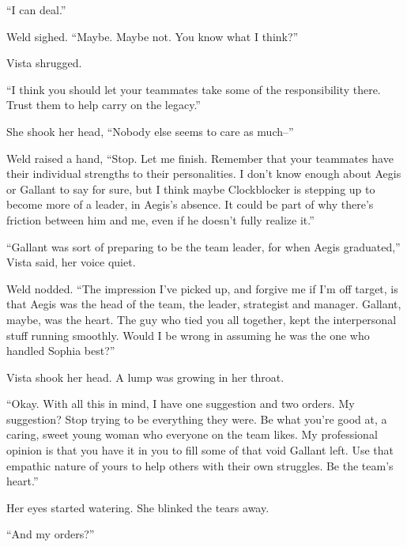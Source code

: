 ``I can deal.''



Weld sighed.  ``Maybe.  Maybe not.  You know what I think?''



Vista shrugged.



``I think you should let your teammates take some of the responsibility there.  Trust them to help carry on the legacy.''



She shook her head, ``Nobody else seems to care as much--''



Weld raised a hand, ``Stop.  Let me finish.  Remember that your teammates have their individual strengths to their personalities.  I don't know enough about Aegis or Gallant to say for sure, but I think maybe Clockblocker is stepping up to become more of a leader, in Aegis's absence.  It could be part of why there's friction between him and me, even if he doesn't fully realize it.''



``Gallant was sort of preparing to be the team leader, for when Aegis graduated,'' Vista said, her voice quiet.



Weld nodded.  ``The impression I've picked up, and forgive me if I'm off target, is that Aegis was the head of the team, the leader, strategist and manager.  Gallant, maybe, was the heart.  The guy who tied you all together, kept the interpersonal stuff running smoothly.  Would I be wrong in assuming he was the one who handled Sophia best?''



Vista shook her head.  A lump was growing in her throat.



``Okay.  With all this in mind, I have one suggestion and two orders.  My suggestion?  Stop trying to be everything they were.  Be what you're good at, a caring, sweet young woman who everyone on the team likes.  My professional opinion is that you have it in you to fill some of that void Gallant left.  Use that empathic nature of yours to help others with their own struggles.  Be the team's heart.''



Her eyes started watering.  She blinked the tears away.



``And my orders?''



